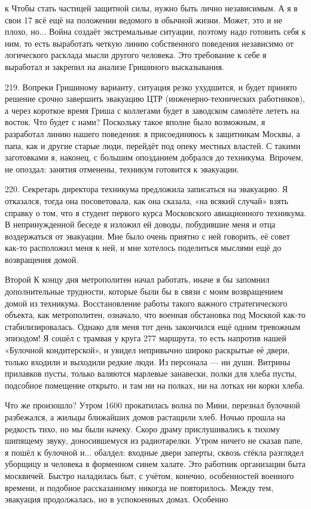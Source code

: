 к Чтобы стать частицей защитной силы, нужно быть лично независимым. А я в свои 17 всё ещё на положении ведомого в обычной жизни. Может, это и не плохо, но... Война создаёт экстремальные ситуации, поэтому надо готовить себя к ним, то есть выработать четкую линию собственного поведения независимо от логического расклада мысли другого человека. Это требование к себе я выработал и закрепил на анализе Гришиного высказывания.

219. Вопреки Гришиному варианту, ситуация резко ухудшится, и будет принято решение срочно завершить эвакуацию ЦТР (инженерно-технических работников), а через короткое время Гриша с коллегами будет в заводском самолёте лететь на восток. Что будет с нами? Поскольку такое вполне было возможным, я разработал линию нашего поведения: я присоединяюсь к защитникам Москвы, а папа, как и другие старые люди, перейдёт под опеку местных властей. С такими заготовками я, наконец, с большим опозданием добрался до техникума. Впрочем, не опоздал: занятия отменены, техникум готовится к эвакуации.

220. Секретарь директора техникума предложила записаться на эвакуацию. Я отказался, тогда она посоветовала, как она сказала, «на всякий случай» взять справку о том, что я студент первого курса Московского авиационного техникума. В непринужденной беседе я изложил ей доводы, побудившие меня и отца воздержаться от эвакуации. Мне было очень приятно с ней говорить, её совет как-то расположил меня к ней, и мне хотелось поделиться мыслями ещё до возвращения домой.

Второй
К концу дня метрополитен начал работать, иначе я бы запомнил дополнительные трудности, которые были бы в связи с моим возвращением домой из техникума. Восстановление работы такого важного стратегического объекта, как метрополитен, означало, что военная обстановка под Москвой как-то стабилизировалась. Однако для меня тот день закончился ещё одним тревожным эпизодом! Я сошёл с трамвая у круга 277 маршрута, то есть напротив нашей «Булочной кондитерской», и увидел непривычно широко раскрытые её двери, только входили и выходили редкие люди. Из персонала — ни души. Витрины прилавков пусты, только валяются марлевые занавески, полки для хлеба пусты, подсобное помещение открыто, и там ни на полках, ни на лотках ни корки хлеба.

Что же произошло? Утром 1600 прокатилась волна по Мини, перезнал булочной разбежался, а жильцы ближайших домов растащили хлеб. Ночью прошла на редкость тихо, но мы были начеку. Скоро драму прислушивались к тихому шипящему звуку, доносившемуся из радиотарелки. Утром ничего не сказав папе, я пошёл к булочной и... обалдел: входные двери заперты, сквозь стёкла разглядел уборщицу и человека в форменном синем халате. Это работник организации быта москвичей. Быстро наладилась быт, с учётом, конечно, особенностей военного времени, и подобное рассказанному никогда не повторилось. Между тем, эвакуация продолжалась, но в успокоенных домах. Особенно

